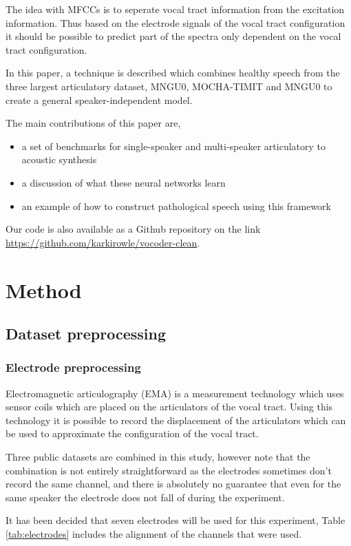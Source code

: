 \documentclass[a4paper]{article}
\begin{document}
The idea with MFCCs is to seperate vocal tract information from the excitation
information. Thus based on the electrode signals of the vocal tract configuration
it should be possible to predict part of the spectra only dependent on the vocal
tract configuration.

In this paper, a technique is described which combines healthy speech from the three largest articulatory dataset, MNGU0, MOCHA-TIMIT and MNGU0 to create a general speaker-independent model. 

The main contributions of this paper are,
\begin{itemize}
\item a set of benchmarks for single-speaker and multi-speaker articulatory to acoustic synthesis
\item a discussion of what these neural networks learn
\item an example of how to construct pathological speech using this framework
\end{itemize}

Our code is also available as a Github repository on the link
\url{https://github.com/karkirowle/vocoder-clean}.

\section{Method}
\subsection{Dataset preprocessing}

\subsubsection{Electrode preprocessing}

Electromagnetic articulography (EMA) is a measurement technology which uses
sensor coils which are placed on the articulators of the vocal tract.
Using this technology it is possible to record the displacement of the articulators
which can be used to approximate the configuration of the vocal tract.

Three public datasets are combined in this study, however note that the combination is not
entirely straightforward as the electrodes sometimes don't record the same channel, and there is absolutely no guarantee that even for the same speaker the electrode does not fall of during the experiment.

It has been decided that seven electrodes will be used for this experiment,
Table \ref{tab:electrodes} includes the alignment of the channels that were used.
\end{document}

